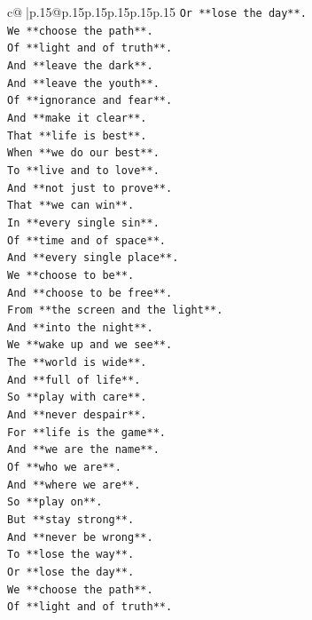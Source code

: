 \documentclass{article}
\begin{document}
{\begin{supertabular}{c@{$\;$}|p{.15\linewidth}@{}p{.15\linewidth}p{.15\linewidth}p{.15\linewidth}p{.15\linewidth}p{.15\linewidth}}
{{{\texttt{Or **lose the day**.} \\
\texttt{We **choose the path**.} \\
\texttt{Of **light and of truth**.} \\
\texttt{And **leave the dark**.} \\
\texttt{And **leave the youth**.} \\
\texttt{Of **ignorance and fear**.} \\
\texttt{And **make it clear**.} \\
\texttt{That **life is best**.} \\
\texttt{When **we do our best**.} \\
\texttt{To **live and to love**.} \\
\texttt{And **not just to prove**.} \\
\texttt{That **we can win**.} \\
\texttt{In **every single sin**.} \\
\texttt{Of **time and of space**.} \\
\texttt{And **every single place**.} \\
\texttt{We **choose to be**.} \\
\texttt{And **choose to be free**.} \\
\texttt{From **the screen and the light**.} \\
\texttt{And **into the night**.} \\
\texttt{We **wake up and we see**.} \\
\texttt{The **world is wide**.} \\
\texttt{And **full of life**.} \\
\texttt{So **play with care**.} \\
\texttt{And **never despair**.} \\
\texttt{For **life is the game**.} \\
\texttt{And **we are the name**.} \\
\texttt{Of **who we are**.} \\
\texttt{And **where we are**.} \\
\texttt{So **play on**.} \\
\texttt{But **stay strong**.} \\
\texttt{And **never be wrong**.} \\
\texttt{To **lose the way**.} \\
\texttt{Or **lose the day**.} \\
\texttt{We **choose the path**.} \\
\texttt{Of **light and of truth**.} \\
}}}
\end{supertabular}}
\end{document}
